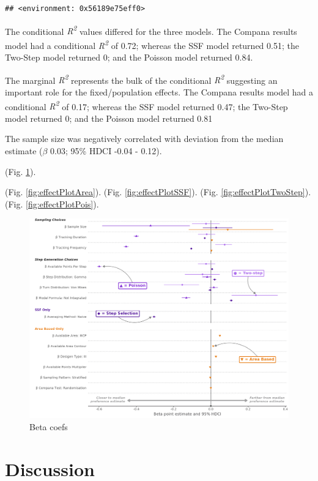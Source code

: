 \documentclass[10pt,a4paper]{article}
\begin{document}
\begin{verbatim}
## <environment: 0x56189e75eff0>
\end{verbatim}

The conditional \emph{R\textsuperscript{2}} values differed for the three models.
The Compana results model had a conditional \emph{R\textsuperscript{2}} of 0.72; whereas the SSF model returned 0.51; the Two-Step model returned 0; and the Poisson model returned 0.84.

The marginal \emph{R\textsuperscript{2}} represents the bulk of the conditional \emph{R\textsuperscript{2}} suggesting an important role for the fixed/population effects.
The Compana results model had a conditional \emph{R\textsuperscript{2}} of 0.17; whereas the SSF model returned 0.47; the Two-Step model returned 0; and the Poisson model returned 0.81

The sample size was negatively correlated with deviation from the median estimate (\(\beta\) 0.03; 95\% HDCI -0.04 - 0.12).

(Fig. \ref{fig:allEffectsPlot}).

(Fig. \ref{fig:effectPlotArea}).
(Fig. \ref{fig:effectPlotSSF}).
(Fig. \ref{fig:effectPlotTwoStep}).
(Fig. \ref{fig:effectPlotPois}).

\begin{figure}
\includegraphics[width=1\linewidth]{../figures/_allEffectsPlot} \caption{Beta coefs}\label{fig:allEffectsPlot}
\end{figure}

\hypertarget{discussion}{%
\section{Discussion}\label{discussion}}
\end{document}
